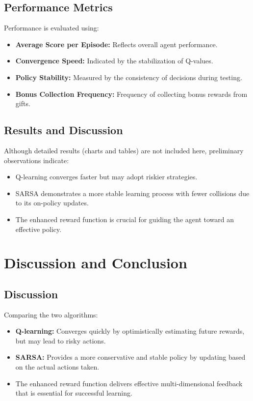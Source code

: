 \documentclass[9pt,a4paper]{article}
\begin{document}
\subsection{Performance Metrics}
Performance is evaluated using:
\begin{itemize}
    \item \textbf{Average Score per Episode:} Reflects overall agent performance.
    \item \textbf{Convergence Speed:} Indicated by the stabilization of Q-values.
    \item \textbf{Policy Stability:} Measured by the consistency of decisions during testing.
    \item \textbf{Bonus Collection Frequency:} Frequency of collecting bonus rewards from gifts.
\end{itemize}

\subsection{Results and Discussion}
Although detailed results (charts and tables) are not included here, preliminary observations indicate:
\begin{itemize}
    \item Q-learning converges faster but may adopt riskier strategies.
    \item SARSA demonstrates a more stable learning process with fewer collisions due to its on-policy updates.
    \item The enhanced reward function is crucial for guiding the agent toward an effective policy.
\end{itemize}

\section{Discussion and Conclusion}
\subsection{Discussion}
Comparing the two algorithms:
\begin{itemize}
    \item \textbf{Q-learning:} Converges quickly by optimistically estimating future rewards, but may lead to risky actions.
    \item \textbf{SARSA:} Provides a more conservative and stable policy by updating based on the actual actions taken.
    \item The enhanced reward function delivers effective multi-dimensional feedback that is essential for successful learning.
\end{itemize}
\end{document}
